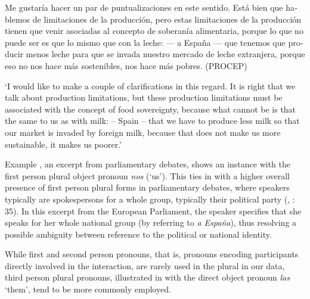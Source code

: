 \documentclass[output=paper]{langscibook}
\begin{document}
\eanoraggedright\label{ex:pierre:6}
\begin{otherlanguage}{spanish}
{Me gustaría hacer un par de puntualizaciones en este sentido. Está bien que hablemos de limitaciones de la producción, pero estas limitaciones de la producción tienen que venir asociadas al concepto de soberanía alimentaria, porque lo que no puede ser es que} {}{ {lo mismo que con la leche:} }{} — a España — que tenemos que producir menos leche para que se invada nuestro mercado de leche extranjera, porque eso no nos hace más sostenibles, nos hace más pobres. {(PROCEP})
\end{otherlanguage}\pagebreak
\glt ‘I would like to make a couple of clarifications in this regard. It is right that we talk about production limitations, but these production limitations must be associated with the concept of food sovereignty, because what cannot be is that   the same to us as with milk:      – Spain – that we have to produce less milk so that our market is invaded by foreign milk, because that does not make us more sustainable, it makes us poorer.’
\z 

Example , an excerpt from parliamentary debates, shows an instance with the first person plural object pronoun \textit{nos} (‘us’). This ties in with a higher overall presence of first person plural forms in parliamentary debates, where speakers typically are spokespersons for a whole group, typically their political party (\citealt{Gelabert-Desnoyer2006a,Gelabert-Desnoyer2006b}, \citealt{DeCock2014}: 35). In this excerpt from the European Parliament, the speaker specifies that she speaks for her whole national group (by referring to \textit{a España}), thus resolving a possible ambiguity between reference to the political or national identity.


While first and second person pronouns, that is, pronouns encoding participants directly involved in the interaction, are rarely used in the plural in our data, third person plural pronouns, illustrated in  with the direct object pronoun \textit{las} ‘them’, tend to be more commonly employed.\largerpage
\end{document}
